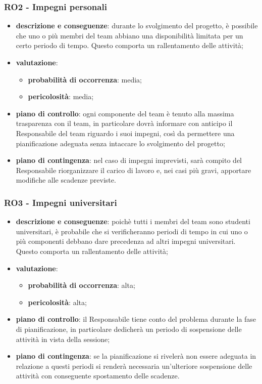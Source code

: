     \subsubsection{RO2 - Impegni personali} \label{sec:RO2}
        \begin{itemize}
            \item \textbf{descrizione e conseguenze}: durante lo svolgimento del progetto, è possibile che uno o più membri del team abbiano una disponibilità limitata per un certo periodo di tempo. Questo comporta un rallentamento delle attività;
            \item \textbf{valutazione}:
            \begin{itemize} 
                \item \textbf{probabilità di occorrenza}: media;
                \item \textbf{pericolosità}: media;
            \end{itemize}
            \item \textbf{piano di controllo}: ogni componente del team è tenuto alla massima trasparenza con il team, in particolare dovrà informare con anticipo il Responsabile del team riguardo i suoi impegni, così da permettere una pianificazione adeguata senza intaccare lo svolgimento del progetto;
            \item \textbf{piano di contingenza}: nel caso di impegni imprevisti, sarà compito del Responsabile riorganizzare il carico di lavoro e, nei casi più gravi, apportare modifiche alle scadenze previste.
        \end{itemize}
        
    \subsubsection{RO3 - Impegni universitari} \label{sec:RO3}
        \begin{itemize}
            \item \textbf{descrizione e conseguenze}: poichè tutti i membri del team sono studenti universitari, è probabile che si verificheranno periodi di tempo in cui uno o più componenti debbano dare precedenza ad altri impegni universitari. Questo comporta un rallentamento delle attività;
            \item \textbf{valutazione}:
            \begin{itemize} 
                \item \textbf{probabilità di occorrenza}: alta;
                \item \textbf{pericolosità}: alta;
            \end{itemize}
            \item \textbf{piano di controllo}: il Responsabile tiene conto del problema durante la fase di pianificazione, in particolare dedicherà un periodo di sospensione delle attività in vista della sessione;
            \item \textbf{piano di contingenza}: se la pianificazione si rivelerà non essere adeguata in relazione a questi periodi si renderà necessaria un'ulteriore sospensione delle attività con conseguente spostamento delle scadenze.
        \end{itemize}
        
